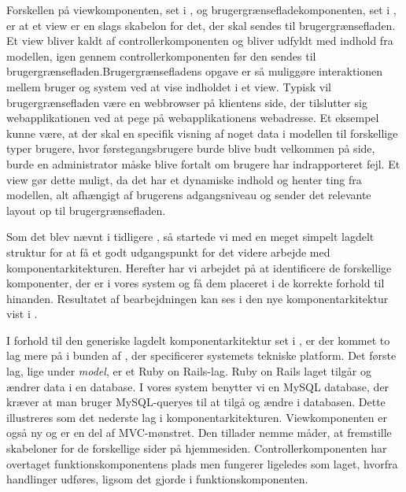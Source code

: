
Forskellen på viewkomponenten, set i , og brugergrænsefladekomponenten, set i , er at et view er en slags skabelon for det, der skal sendes til brugergrænsefladen. Et view bliver kaldt af controllerkomponenten og bliver udfyldt med indhold fra modellen, igen gennem controllerkomponenten før den sendes til brugergrænsefladen.Brugergrænsefladens opgave er så muliggøre interaktionen mellem bruger og system ved at vise indholdet i et view. Typisk vil brugergrænsefladen være en webbrowser på klientens side, der tilslutter sig webapplikationen ved at pege på webapplikationens webadresse. Et eksempel kunne være, at der skal en specifik visning af noget data i modellen til forskellige typer brugere, hvor førstegangsbrugere burde blive budt velkommen på side, burde en administrator måske blive fortalt om brugere har indrapporteret fejl. Et view gør dette muligt, da det har et dynamiske indhold og henter ting fra modellen, alt afhængigt af brugerens adgangsniveau og sender det relevante layout op til brugergrænsefladen. 

Som det blev nævnt i tidligere , så startede vi med en meget simpelt lagdelt struktur for at få et godt udgangspunkt for det videre arbejde med komponentarkitekturen. Herefter har vi arbejdet på at identificere de forskellige komponenter, der er i vores system og få dem placeret i de korrekte forhold til hinanden. Resultatet af bearbejdningen kan ses i den nye komponentarkitektur vist i .

I forhold til den generiske lagdelt komponentarkitektur set i , er der kommet to lag mere på i bunden af , der specificerer systemets tekniske platform. Det første lag, lige under \textit{model}, er et Ruby on Rails-lag. Ruby on Rails laget tilgår og ændrer data i en database. I vores system benytter vi en MySQL database, der kræver at man bruger MySQL-queryes til at tilgå og ændre i databasen. Dette illustreres som det nederste lag i komponentarkitekturen. Viewkomponenten er også ny og er en del af MVC-mønstret. Den tillader nemme måder, at fremstille skabeloner for de forskellige sider på hjemmesiden. Controllerkomponenten har overtaget funktionskomponentens plads men fungerer ligeledes som laget, hvorfra handlinger udføres, ligsom det gjorde i funktionskomponenten.


